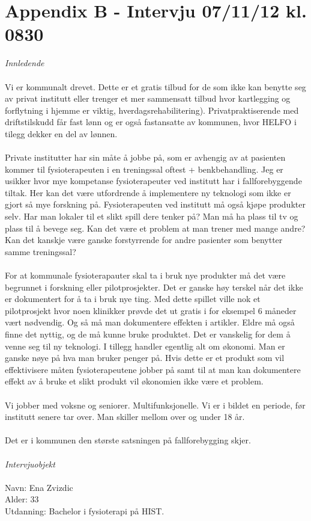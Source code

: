 \newpage
\section*{Appendix B - Intervju 07/11/12 kl. 0830}
\label{B}
\emph{Innledende}\\ \\
Vi er kommunalt drevet. Dette er et gratis tilbud for de som ikke kan benytte seg av privat institutt eller trenger et mer sammensatt tilbud hvor kartlegging og forflytning i hjemme er viktig, hverdagsrehabilitering). Privatpraktiserende med driftstilskudd får fast lønn og er også fastansatte av kommunen, hvor HELFO i tilegg dekker en del av lønnen. \\ \\
Private institutter har sin måte å jobbe på, som er avhengig av at pasienten kommer til fysioterapeuten i en treningssal oftest + benkbehandling. Jeg er usikker hvor mye kompetanse fysioterapeuter ved institutt har i fallforebyggende tiltak. Her kan det være utfordrende å implementere ny teknologi som ikke er gjort så mye forskning på. Fysioterapeuten ved institutt må også kjøpe produkter selv. Har man lokaler til et slikt spill dere tenker på? Man må ha plass til tv og plass til å bevege seg. Kan det være et problem at man trener med mange andre? Kan det kanskje være ganske forstyrrende for andre pasienter som benytter samme treningssal? \\ \\
For at kommunale fysioterapauter skal ta i bruk nye produkter må det være begrunnet i forskning eller pilotprosjekter. Det er ganske høy terskel når det ikke er dokumentert for å ta i bruk nye ting. Med dette spillet ville nok et pilotprosjekt hvor noen klinikker prøvde det ut gratis i for eksempel 6 måneder vært nødvendig. Og så må man dokumentere effekten i artikler.  Eldre må også finne det nyttig, og de må kunne bruke produktet. Det er vanskelig for dem å venne seg til ny teknologi. I tillegg handler egentlig alt om økonomi. Man er ganske nøye på hva man bruker penger på.  Hvis dette er et produkt som vil effektivisere måten fysioterapeutene jobber på samt til at man kan dokumentere effekt av å bruke et slikt produkt vil økonomien ikke være et problem.\\ \\
Vi jobber med voksne og seniorer. Multifunksjonelle. Vi er i bildet en periode, før institutt senere tar over. Man skiller mellom over og under 18 år.  \\ \\
Det er i kommunen den største satsningen på fallforebygging skjer. \\ \\ 
\emph{Intervjuobjekt}\\ \\
Navn: Ena Zvizdic\\
Alder: 33\\
Utdanning: Bachelor i fysioterapi på HIST. \\ \\

